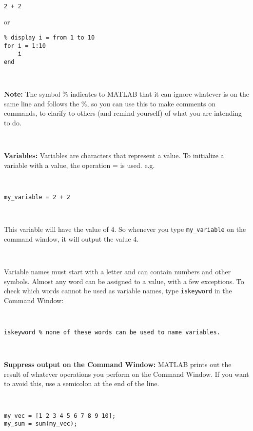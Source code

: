 \documentclass[11pt]{amsart}
\begin{document}
\

\color{blue}
\begin{verbatim}
2 + 2
\end{verbatim}
\color{black}
or
\color{blue}
\begin{verbatim}
% display i = from 1 to 10
for i = 1:10 
	i
end
\end{verbatim}
\color{black}

\

{\bf Note:} The symbol $\%$ indicates to MATLAB that it can ignore whatever is on the same line and follows the $\%$, so you can use this to make comments on commands, to clarify to others (and remind yourself) of what you are intending to do.

\

{\bf Variables:} Variables are characters that represent a value. To initialize a variable with a value, the operation = is used. 
e.g.

\

\color{blue}
\begin{verbatim}
my_variable = 2 + 2
\end{verbatim}
\color{black}

\

This variable will have the value of 4. So whenever you type \verb+my_variable+ on the command window, it will output the value 4. 

\

Variable names must start with a letter and can contain numbers and other symbols. Almost any word can be assigned to a value, with a few exceptions. To check which words cannot be used as variable names, type \verb+iskeyword+ in the Command Window: 

\

\color{blue}
\begin{verbatim}
iskeyword % none of these words can be used to name variables.
\end{verbatim}
\color{black}

\

{\bf Suppress output on the Command Window:} MATLAB prints out the result of whatever operations you perform on the Command Window. If you want to avoid this, use a semicolon at the end of the line.

\

\color{blue}
\begin{verbatim}
my_vec = [1 2 3 4 5 6 7 8 9 10];
my_sum = sum(my_vec);
\end{verbatim}
\color{black}
\end{document}
